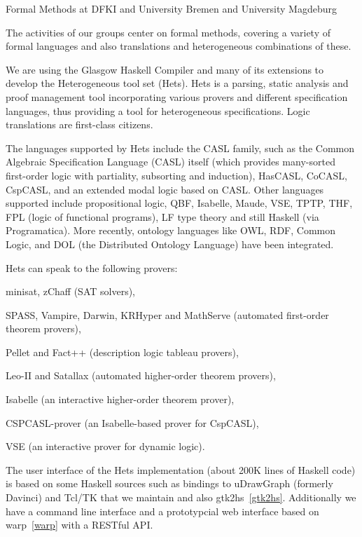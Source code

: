 \begin{hcarentry}[section]{Formal Methods at DFKI and University Bremen and University Magdeburg}
\makeheader

The activities of our groups center on formal methods, covering a
variety of formal languages and also translations and heterogeneous
combinations of these.

We are using the Glasgow Haskell Compiler and many of its extensions
to develop the Heterogeneous tool set (Hets).  Hets is a parsing,
static analysis and proof management tool incorporating various
provers and different specification languages, thus providing a tool
for heterogeneous specifications. Logic translations are first-class
citizens.

The languages supported by Hets include the CASL family, such as the
Common Algebraic Specification Language (CASL) itself (which provides
many-sorted first-order logic with partiality, subsorting and
induction), HasCASL, CoCASL, CspCASL, and an extended modal logic
based on CASL. Other languages supported include propositional logic,
QBF, Isabelle, Maude, VSE, TPTP, THF, FPL (logic of functional
programs), LF type theory and still Haskell (via Programatica). More
recently, ontology languages like OWL, RDF, Common Logic, and DOL (the
Distributed Ontology Language) have been integrated.

Hets can speak to the following provers:
\begin{compactitem}
\item
minisat, zChaff (SAT solvers),
\item
SPASS, Vampire, Darwin, KRHyper and MathServe (automated first-order theorem provers),
\item
Pellet and Fact++ (description logic tableau provers),
\item
Leo-II and Satallax (automated higher-order theorem provers),
\item
Isabelle (an interactive higher-order theorem prover),
\item
CSPCASL-prover (an Isabelle-based prover for CspCASL),
\item VSE (an interactive prover for dynamic logic).
\end{compactitem}

The user interface of the Hets implementation (about 200K lines of
Haskell code) is based on some Haskell sources such as bindings to
uDrawGraph (formerly Davinci) and Tcl/TK that we maintain and also
gtk2hs~\cref{gtk2hs}.  Additionally we have a command line interface
and a prototypcial web interface based on warp~\cref{warp} with a
RESTful API.


\end{hcarentry}
